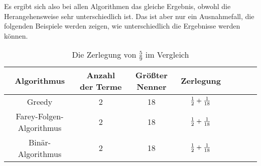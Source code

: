 \begin{bsp}
	Es ergibt sich also bei allen Algorithmen das gleiche Ergebnis, obwohl die Herangehensweise sehr unterschiedlich ist. Das ist aber nur ein Ausnahmefall, die folgenden Beispiele werden zeigen, wie unterschiedlich die Ergebnisse werden können.
	
	\vspace{0.5cm}
	\begin{table}[H]
		\centering
		\begin{tabular}{|Sc | Sc | Sc | Sc|}
			\hline
			Algorithmus & Anzahl der Terme & Größter Nenner & Zerlegung \\ \hline
			Greedy & 2 & 18 & $\frac{1}{2}+\frac{1}{18}$ \\ \hline
			Farey-Folgen-Algorithmus & 2 & 18 & $\frac{1}{2}+\frac{1}{18}$ \\ \hline
			Binär-Algorithmus & 2 & 18 & $\frac{1}{2}+\frac{1}{18}$ \\ \hline
		\end{tabular}
		\caption{Die Zerlegung von $\frac{5}{9}$ im Vergleich}
		\label{table:vgl5/9}
	\end{table}
\end{bsp}


